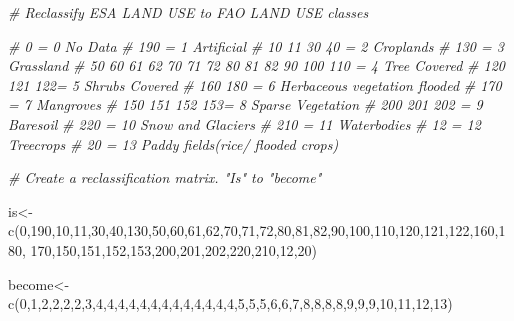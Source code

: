 \documentclass[
  10pt,
  b5paper,
]{book}
\newenvironment{Shaded}{\begin{snugshade}}{\end{snugshade}}
\newcommand{\CommentTok}[1]{\textcolor[rgb]{0.56,0.35,0.01}{\textit{#1}}}
\newcommand{\DecValTok}[1]{\textcolor[rgb]{0.00,0.00,0.81}{#1}}
\newcommand{\FunctionTok}[1]{\textcolor[rgb]{0.00,0.00,0.00}{#1}}
\newcommand{\NormalTok}[1]{#1}
\newcommand{\OtherTok}[1]{\textcolor[rgb]{0.56,0.35,0.01}{#1}}
\begin{document}
\begin{Shaded}
\begin{Highlighting}[]
\CommentTok{\# Reclassify ESA LAND USE to FAO LAND USE classes}

\CommentTok{\#   0 = 0     No Data}
\CommentTok{\#   190 = 1 Artificial}
\CommentTok{\#   10 11 30 40 = 2 Croplands}
\CommentTok{\#   130 = 3 Grassland}
\CommentTok{\#   50 60 61 62 70 71 72 80 81 82 90 100 110 = 4 Tree Covered}
\CommentTok{\#   120 121 122= 5 Shrubs Covered}
\CommentTok{\#   160 180 = 6 Herbaceous vegetation flooded}
\CommentTok{\#   170 = 7 Mangroves}
\CommentTok{\#   150 151 152 153= 8 Sparse Vegetation}
\CommentTok{\#   200 201 202 = 9 Baresoil}
\CommentTok{\#   220 = 10 Snow and Glaciers}
\CommentTok{\#   210 = 11 Waterbodies}
\CommentTok{\#   12  = 12 Treecrops}
\CommentTok{\# 20 = 13 Paddy fields(rice/ flooded crops)}

\CommentTok{\# Create a reclassification matrix. "Is" to "become"}

\NormalTok{is}\OtherTok{\textless{}{-}}\FunctionTok{c}\NormalTok{(}\DecValTok{0}\NormalTok{,}\DecValTok{190}\NormalTok{,}\DecValTok{10}\NormalTok{,}\DecValTok{11}\NormalTok{,}\DecValTok{30}\NormalTok{,}\DecValTok{40}\NormalTok{,}\DecValTok{130}\NormalTok{,}\DecValTok{50}\NormalTok{,}\DecValTok{60}\NormalTok{,}\DecValTok{61}\NormalTok{,}\DecValTok{62}\NormalTok{,}\DecValTok{70}\NormalTok{,}\DecValTok{71}\NormalTok{,}\DecValTok{72}\NormalTok{,}\DecValTok{80}\NormalTok{,}\DecValTok{81}\NormalTok{,}\DecValTok{82}\NormalTok{,}\DecValTok{90}\NormalTok{,}\DecValTok{100}\NormalTok{,}\DecValTok{110}\NormalTok{,}\DecValTok{120}\NormalTok{,}\DecValTok{121}\NormalTok{,}\DecValTok{122}\NormalTok{,}\DecValTok{160}\NormalTok{,}\DecValTok{180}\NormalTok{,}
\DecValTok{170}\NormalTok{,}\DecValTok{150}\NormalTok{,}\DecValTok{151}\NormalTok{,}\DecValTok{152}\NormalTok{,}\DecValTok{153}\NormalTok{,}\DecValTok{200}\NormalTok{,}\DecValTok{201}\NormalTok{,}\DecValTok{202}\NormalTok{,}\DecValTok{220}\NormalTok{,}\DecValTok{210}\NormalTok{,}\DecValTok{12}\NormalTok{,}\DecValTok{20}\NormalTok{)}

\NormalTok{become}\OtherTok{\textless{}{-}}\FunctionTok{c}\NormalTok{(}\DecValTok{0}\NormalTok{,}\DecValTok{1}\NormalTok{,}\DecValTok{2}\NormalTok{,}\DecValTok{2}\NormalTok{,}\DecValTok{2}\NormalTok{,}\DecValTok{2}\NormalTok{,}\DecValTok{3}\NormalTok{,}\DecValTok{4}\NormalTok{,}\DecValTok{4}\NormalTok{,}\DecValTok{4}\NormalTok{,}\DecValTok{4}\NormalTok{,}\DecValTok{4}\NormalTok{,}\DecValTok{4}\NormalTok{,}\DecValTok{4}\NormalTok{,}\DecValTok{4}\NormalTok{,}\DecValTok{4}\NormalTok{,}\DecValTok{4}\NormalTok{,}\DecValTok{4}\NormalTok{,}\DecValTok{4}\NormalTok{,}\DecValTok{4}\NormalTok{,}\DecValTok{5}\NormalTok{,}\DecValTok{5}\NormalTok{,}\DecValTok{5}\NormalTok{,}\DecValTok{6}\NormalTok{,}\DecValTok{6}\NormalTok{,}\DecValTok{7}\NormalTok{,}\DecValTok{8}\NormalTok{,}\DecValTok{8}\NormalTok{,}\DecValTok{8}\NormalTok{,}\DecValTok{8}\NormalTok{,}\DecValTok{9}\NormalTok{,}\DecValTok{9}\NormalTok{,}\DecValTok{9}\NormalTok{,}\DecValTok{10}\NormalTok{,}\DecValTok{11}\NormalTok{,}\DecValTok{12}\NormalTok{,}\DecValTok{13}\NormalTok{)}


\end{Highlighting}
\end{Shaded}
\end{document}
